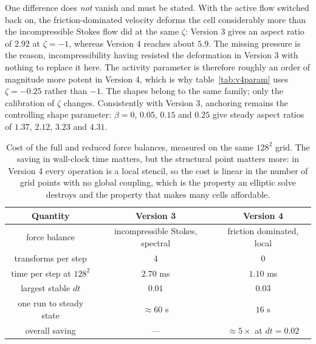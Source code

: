 \documentclass[11pt]{article}
\begin{document}
One difference does \textit{not} vanish and must be stated. With the active flow
switched back on, the friction-dominated velocity deforms the cell considerably
more than the incompressible Stokes flow did at the same $\zeta$: Version 3 gives
an aspect ratio of $2.92$ at $\zeta=-1$, whereas Version 4 reaches about $5.9$.
The missing pressure is the reason, incompressibility having resisted the
deformation in Version 3 with nothing to replace it here. The activity parameter
is therefore roughly an order of magnitude more potent in Version 4, which is why
table~\ref{tab:v4param} uses $\zeta=-0.25$ rather than $-1$. The shapes belong to
the same family; only the calibration of $\zeta$ changes. Consistently with
Version 3, anchoring remains the controlling shape parameter: $\beta=0$, $0.05$,
$0.15$ and $0.25$ give steady aspect ratios of $1.37$, $2.12$, $3.23$ and $4.31$.

\begin{table} [ht!]
\begin{center}
\begin{tabular}{ |c|c|c| }
 \hline
 Quantity & Version 3 & Version 4 \\
 \hline
 force balance & incompressible Stokes, spectral & friction dominated, local \\
 \hline
 transforms per step & 4 & 0 \\
 \hline
 time per step at $128^{2}$ & $2.70$ ms & $1.10$ ms \\
 \hline
 largest stable $dt$ & $0.01$ & $0.03$ \\
 \hline
 one run to steady state & $\approx60$ s & $16$ s \\
 \hline
 overall saving & --- & $\approx5\times$ at $dt=0.02$ \\
 \hline
\end{tabular}
\end{center}
\caption{Cost of the full and reduced force balances, measured on the same
$128^{2}$ grid. The saving in wall-clock time matters, but the structural point
matters more: in Version 4 every operation is a local stencil, so the cost is
linear in the number of grid points with no global coupling, which is the
property an elliptic solve destroys and the property that makes many cells
affordable.}
\label{tab:speed}
\end{table}

\end{document}
